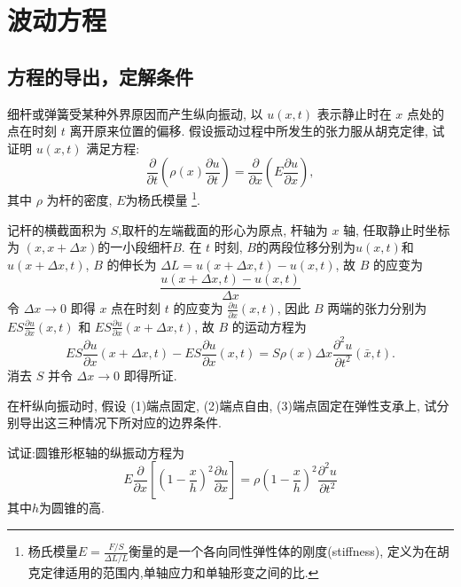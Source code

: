 
\chapter{波动方程}

\section{方程的导出，定解条件}


\begin{exercise}
  细杆或弹簧受某种外界原因而产生纵向振动, 
  以 $u(x,t)$ 表示静止时在 $x$ 点处的点在时刻 $t$ 离开原来位置的偏移.
  假设振动过程中所发生的张力服从胡克定律, 试证明 $u(x,t)$ 满足方程:
  \[\frac{\partial}{\partial t}\left(\rho(x)\frac{\partial u}{\partial t}\right)
    = \frac{\partial}{\partial x}\left(E\frac{\partial u}{\partial x}\right),\]
  其中 $\rho$ 为杆的密度, $E$为杨氏模量%
  \footnote{杨氏模量$E=\frac{F/S}{\Delta L/L}$衡量的是一个各向同性弹性体的刚度(stiffness),
    定义为在胡克定律适用的范围内,单轴应力和单轴形变之间的比.}.
\end{exercise}


  记杆的横截面积为 $S$,取杆的左端截面的形心为原点, 杆轴为 $x$ 轴,
  任取静止时坐标为 $(x,x+\Delta x)$的一小段细杆$B$.
  在 $t$ 时刻, $B$的两段位移分别为$u(x,t)$和$u(x+\Delta x,t)$,
  $B$ 的伸长为 $\Delta L=u(x+\Delta x,t)-u(x,t)$, 故 $B$ 的应变为
  \[\frac{u(x+\Delta x,t)-u(x,t)}{\Delta x}\]
  令 $\Delta x\to 0$ 即得 $x$ 点在时刻 $t$ 的应变为 $\frac{\partial u}{\partial x}(x,t)$,
  因此 $B$ 两端的张力分别为 $ES\frac{\partial u}{\partial x}(x,t)$
  和 $ES\frac{\partial u}{\partial x}(x+\Delta x,t)$, 故 $B$ 的运动方程为
  \[ES\frac{\partial u}{\partial x}(x+\Delta x,t)-ES\frac{\partial u}{\partial x}(x,t)
    = S\rho(x)\Delta x\frac{\partial^2u}{\partial t^2}(\bar{x},t).\]
  消去 $S$ 并令 $\Delta x\to 0$ 即得所证.



\begin{exercise}
  在杆纵向振动时, 假设 (1)端点固定, (2)端点自由, (3)端点固定在弹性支承上,
  试分别导出这三种情况下所对应的边界条件.
\end{exercise}



\begin{exercise}
  试证:圆锥形枢轴的纵振动方程为
  \[E\frac{\partial}{\partial x}\left[\left(1-\frac{x}{h}\right)^2\frac{\partial u}{\partial x}\right]=\rho\left(1-\frac{x}{h}\right)^2\frac{\partial^2u}{\partial t^2}\]
  其中$h$为圆锥的高.
\end{exercise}

